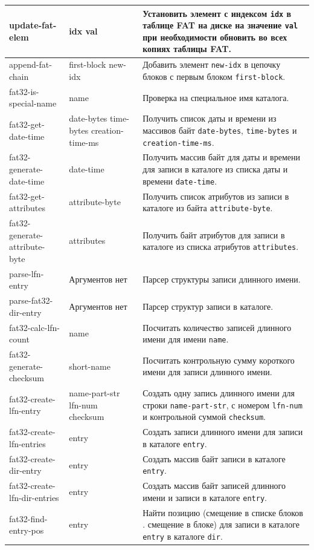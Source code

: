 \begin{xltabular}{\textwidth}{|p{3.5cm}|p{3.5cm}|>{\setlength{\baselineskip}{0.7\baselineskip}}X|}
	update-fat-elem & idx val & Установить элемент с индексом \texttt{idx} в таблице FAT на диске на значение \texttt{val} при необходимости обновить во всех копиях таблицы FAT. \\ \hline
	append-fat-chain & first-block new-idx & Добавить элемент \texttt{new-idx} в цепочку блоков с первым блоком \texttt{first-block}. \\ \hline
	fat32-is-special-name & name & Проверка на специальное имя каталога. \\ \hline
	fat32-get-date-time & date-bytes time-bytes creation-time-ms & Получить список даты и времени из массивов байт \texttt{date-bytes}, \texttt{time-bytes} и \texttt{creation-time-ms}. \\ \hline
	fat32-generate-date-time & date-time & Получить массив байт для даты и времени для записи в каталоге из списка даты и времени \texttt{date-time}. \\ \hline
	fat32-get-attributes & attribute-byte & Получить список атрибутов из записи в каталоге из байта \texttt{attribute-byte}. \\ \hline
	fat32-generate-attribute-byte & attributes & Получить байт атрибутов для записи в каталоге из списка атрибутов \texttt{attributes}. \\ \hline
	parse-lfn-entry & Аргументов нет & Парсер структуры записи длинного имени. \\ \hline
	parse-fat32-dir-entry & Аргументов нет & Парсер структур записи в каталоге. \\ \hline
	fat32-calc-lfn-count & name & Посчитать количество записей длинного имени для имени \texttt{name}. \\ \hline
	fat32-generate-checksum & short-name & Посчитать контрольную сумму короткого имени для записи длинного имени. \\ \hline
	fat32-create-lfn-entry & name-part-str lfn-num checksum & Создать одну запись длинного имени для строки \texttt{name-part-str}, с номером \texttt{lfn-num} и контрольной суммой \texttt{checksum}. \\ \hline
	fat32-create-lfn-entries & entry & Создать записи длинного имени для записи в каталоге \texttt{entry}. \\ \hline
	fat32-create-dir-entry & entry & Создать массив байт записи в каталоге \texttt{entry}. \\ \hline
	fat32-create-lfn-dir-entries & entry & Создать массив байт записей длинного имени и записи в каталоге \texttt{entry}. \\ \hline
	fat32-find-entry-pos & entry & Найти позицию (смещение в списке блоков . смещение в блоке) для записи в каталоге \texttt{entry} в каталоге \texttt{dir}. \\ \hline

\end{xltabular}
